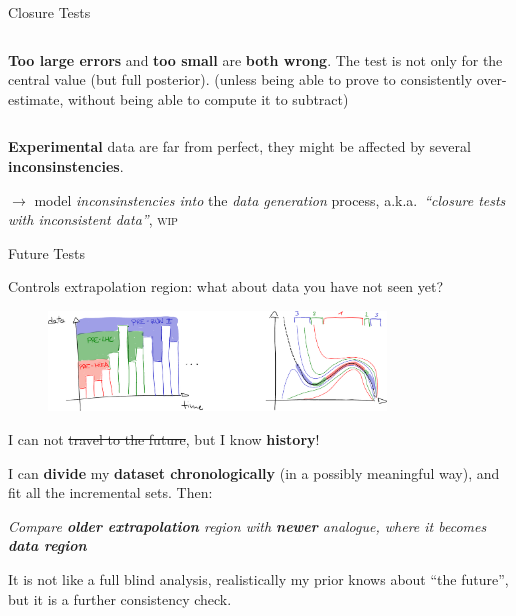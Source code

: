 \documentclass[9pt]{beamer}
\begin{document}
\begin{frame}{Closure Tests}
\begin{columns}
\begin{column}{0.5\textwidth}
            \textbf{Too large errors} and \textbf{too small} are \textbf{both
            wrong}. The test is not only for the central value (but full
            posterior).\newline
            {\footnotesize (unless being able to prove to consistently
            over-estimate, without being able to compute it to subtract)}
        \end{column}
    \end{columns}
    \vspace*{30pt}

    \textbf{Experimental} data are far from perfect, they might be affected by several
    \textbf{inconsinstencies}.
    \begin{flushright}
        $\to$ model \textit{inconsinstencies into} the \textit{data generation}
        process, a.k.a.\ \alert{\textit{\enquote{closure tests with
        inconsistent data}}}, \textsc{wip}
    \end{flushright}
\end{frame}

\begin{frame}{Future Tests}
    \vspace*{10pt}

    Controls extrapolation region: what about data you have not seen yet?
    \vspace*{10pt}

    \begin{figure}
        \centering
        \includegraphics[width=0.8\textwidth]{future-tests}
    \end{figure}

    I can not \sout{travel to the future}, but I know \textbf{history}!
    \vspace*{10pt}

    I can \textbf{divide} my \textbf{dataset \alert{chronologically}} (in a
    possibly meaningful way), and fit all the incremental sets.
    Then: 

    \begin{center}
        \itshape
        Compare \textbf{older extrapolation} region with \textbf{newer}
        analogue, where it becomes \textbf{data region}
    \end{center}

    {\footnotesize It is not like a full blind analysis, realistically my prior
    knows about \enquote{the future}, but it is a further consistency check.}
\end{frame}
\end{document}
